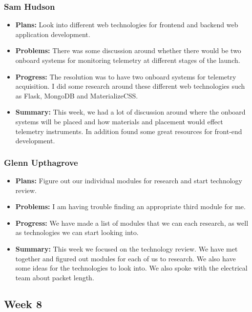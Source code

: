 \documentclass[onecolumn, draftclsnofoot,10pt, compsoc]{IEEEtran}
\begin{document}
\subsubsection{Sam Hudson}
\begin {itemize}
\item \textbf{Plans: }Look into different web technologies for frontend and backend web application development.
\item \textbf{Problems: }There was some discussion around whether there would be two onboard systems for monitoring telemetry at different stages of the launch.
\item \textbf{Progress: } The resolution was to have two onboard systems for telemetry acquisition. I did some research around these different web technologies such as Flask, MongoDB and MaterializeCSS.
\item \textbf{Summary: }This week, we had a lot of discussion around where the onboard systems will be placed and how materials and placement would effect telemetry instruments. In addition found some great resources for front-end development.
\end {itemize}
\subsubsection{Glenn Upthagrove}
\begin {itemize}
 \item \textbf{Plans: }Figure out our individual modules for research and start technology review.
 \item \textbf{Problems: }I am having trouble finding an appropriate third module for me. 
 \item \textbf{Progress: }We have made a list of modules that we can each research, as well as technologies we can start looking into. 
 \item \textbf{Summary: }This week we focused on the technology review. We have met together and figured out modules for each of us to research. We also have some ideas for the technologies to look into. We also spoke with the electrical team about packet length. 
\end {itemize}
\subsection {Week 8}
\end{document}
